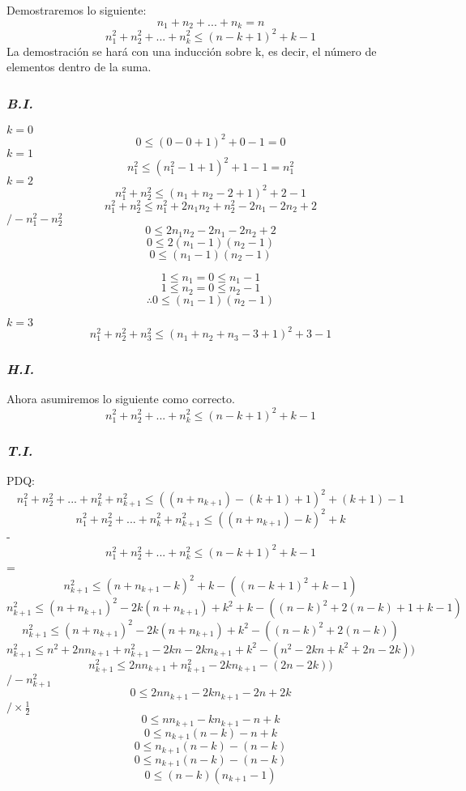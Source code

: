 \documentclass[../doc.tex]{subfiles}
\begin{document}
Demostraremos lo siguiente:
\[ n_1 + n_2 + ... + n_k = n \]
\[ n_1^2 + n_2^2 + ... + n_k^2 \leq (n-k+1)^2 + k -1\]
La demostración se hará con una inducción sobre k, es decir, el número de 
elementos dentro de la suma.

\subsubsection*{\emph{B.I.}}
$k=0$
\[0 \leq (0 - 0 +1)^2 + 0 -1 = 0\]
$k=1$
\[ n_1^2 \leq (n_1^2 - 1 + 1)^2 + 1 - 1 = n_1^2\]
$k=2$
\[ n_1^2 + n_2^2 \leq (n_1 + n_2 - 2 + 1)^2 + 2 -1  \]
\[ n_1^2 + n_2^2 \leq n_1^2 + 2n_1n_2+n_2^2-2n_1-2n_2+2 \]
\hspace*{0pt}\hfill $/ - n_1^2 - n_2^2$
\[ 0 \leq  2n_1n_2-2n_1-2n_2+2 \]
\[ 0 \leq 2(n_1 - 1)(n_2 - 1) \]
\[ 0 \leq (n_1 - 1)(n_2 -1) \]

\[ 1 \leq n_1 = 0 \leq n_1 - 1  \]
\[ 1 \leq n_2 = 0 \leq n_2 -1  \]
\[ \therefore  0 \leq (n_1 - 1)(n_2 -1)\]

$k=3$
\[ n_1^2 + n_2^2 + n_3^2 \leq (n_1 + n_2 + n_3 - 3 + 1)^2 + 3 -1\]

\subsubsection*{\emph{H.I.}}
Ahora asumiremos lo siguiente como correcto.
\[ n_1^2 + n_2^2 + ... + n_k^2 \leq (n-k+1)^2 + k -1\]


\subsubsection*{\emph{T.I.}}
PDQ:
\[ n_1^2 + n_2^2 + ... + n_k^2 + n_{k+1}^2 \leq ((n + n_{k+1}) - (k+1) + 1)^2 + (k+1)-1 \]
\[ n_1^2 + n_2^2 + ... + n_k^2 + n_{k+1}^2 \leq ((n + n_{k+1}) - k)^2 + k \]
-\[   n_1^2 + n_2^2 + ... + n_k^2 \leq (n-k+1)^2 + k -1\]
=\[ n_{k+1}^2 \leq (n+n_{k+1} - k)^2 + k - ((n-k+1)^2 + k -1) \]
\[ n_{k+1}^2 \leq (n+n_{k+1})^2 - 2k(n+n_{k+1}) + k^2 + k - ((n-k)^2 + 2(n-k) + 1+ k -1) \]
\[ n_{k+1}^2 \leq (n+n_{k+1})^2 - 2k(n+n_{k+1}) + k^2 - ((n-k)^2 + 2(n-k)) \]
\[ n_{k+1}^2 \leq n^2 + 2nn_{k+1} + n_{k+1}^2 - 2kn -2kn_{k+1} + k^2  - (n^2 - 2kn +k^2 + 2n - 2k)) \]
\[ n_{k+1}^2 \leq 2nn_{k+1} + n_{k+1}^2 -2kn_{k+1} - ( 2n - 2k)) \]
\hspace*{0pt}\hfill $/ -n_{k+1}^2 $
\[ 0 \leq 2nn_{k+1} -2kn_{k+1} - 2n + 2k \]
\hspace*{0pt}\hfill $/ \times\frac{1}{2} $
\[ 0 \leq nn_{k+1} -kn_{k+1} - n + k \]
\[ 0 \leq n_{k+1}(n-k) - n + k \]
\[ 0 \leq n_{k+1}(n-k) - (n - k) \]
\[ 0 \leq n_{k+1}(n-k) - (n - k) \]
\[ 0 \leq (n-k)( n_{k+1}-1) \]
\end{document}
